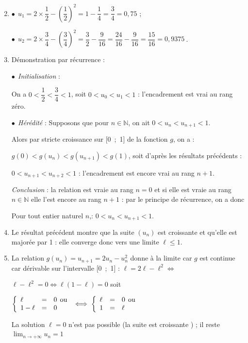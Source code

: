 \documentclass[10pt]{article}
\providecommand{\N}{\mathbb{N}}
\providecommand{\np}[2][]{{#2~#1}}
\begin{document}
\begin{enumerate}
\setcounter{enumi}{1}
\item 
$\bullet~~u_1 = 2 \times \dfrac{1}{2} - \left(\dfrac{1}{2}\right)^2 = 1 - \dfrac14 = \dfrac34 = 0,75$ ;

$\bullet~~u_2 = 2 \times \dfrac34 - \left(\dfrac34\right)^2 = \dfrac32 - \dfrac{9}{16} = \dfrac{24}{16} -  \dfrac{9}{16} = \dfrac{15}{16} = \np{0,9375}$.
\item 
Démonstration par récurrence :

$\bullet~~$\emph{Initialisation} :

On a $0 < \dfrac12 < \dfrac34 < 1$, soit $0 < u_0 < u_1 < 1$ : l'encadrement est vrai au rang zéro.

$\bullet~~$\emph{Hérédité} :
Supposons que pour $n \in \N$, on ait $0 < u_{n} < u_{n+1}< 1$.

Alors par stricte croissance sur [0~;~1] de la fonction $g$, on a :

$g(0) < g\left(u_n\right) < g\left(u_{n+1} \right) < g(1)$, soit d'après les résultats précédents :

$0 < u_{n+1} < u_{n+2} < 1$ : l'encadrement est encore vrai au rang $n + 1$.

\emph{Conclusion} : la relation est vraie au rang $n = 0$ et si elle est vraie au rang $n \in \N$ elle l'est encore au rang $n + 1$ : par le principe de récurrence, on a donc 

Pour tout entier naturel $n$,\:: $0 < u_{n} < u_{n+1} < 1$.
\item 
Le résultat précédent montre que la suite $\left(u_{n}\right)$ est croissante  et qu'elle est majorée par 1 : elle converge donc vers une limite $\ell \leqslant 1$.
\item 
La relation $g\left(u_n\right) = u_{n+1} = 2u_n - u_n^2$ donne à la limite car $g$ est continue car dérivable sur l'intervalle [0~;~1] : $\ell = 2\ell - \ell^2 \iff $

$\ell - \ell^2 = 0 \iff \ell (1 - \ell) = 0$ soit 

$\left\{\begin{array}{l c l}
\ell&=&0 \:\:\text{ou}\\
1 - \ell&=&0
\end{array}\right. \iff \left\{\begin{array}{l c l}
\ell&=&0 \:\:\text{ou}\\
1  &=&\ell
\end{array}\right.$

La solution $\ell = 0 $ n'est pas possible (la suite est croissante ) ; il reste $\displaystyle\lim_{n \to + \infty} u_n = 1$
\end{enumerate}
\end{document}
